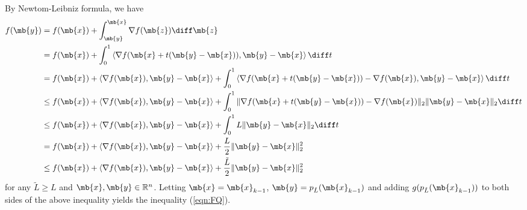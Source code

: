 \begin{exercise}
\begin{enumerate}
            \begin{solution}
                By Newtom-Leibniz formula, we have
                \begin{align*}
                    f(\mb{y}) & = f(\mb{x}) + \int_{\mb{y}}^{\mb{x}} \nabla f(\mb{z}) \diff \mb{z}                                                                                                                                 \\
                              & = f(\mb{x}) + \int_0^1 \left\langle \nabla f(\mb{x} + t(\mb{y} - \mb{x})), \mb{y} - \mb{x} \right\rangle \diff t                                                                                   \\
                              & = f(\mb{x}) + \left\langle \nabla f(\mb{x}), \mb{y} - \mb{x} \right\rangle + \int_0^1 \left\langle \nabla f(\mb{x} + t(\mb{y} - \mb{x})) - \nabla f(\mb{x}), \mb{y} - \mb{x} \right\rangle \diff t \\
                              & \le f(\mb{x}) + \left\langle \nabla f(\mb{x}), \mb{y} - \mb{x} \right\rangle  + \int_0^1 \| \nabla f(\mb{x} + t(\mb{y} - \mb{x})) - \nabla f(\mb{x}) \|_2 \|\mb{y} - \mb{x}\|_2 \diff t            \\
                              & \le f(\mb{x}) + \left\langle \nabla f(\mb{x}), \mb{y} - \mb{x} \right\rangle  + \int_0^1 L \| \mb{y} - \mb{x}\|_2 \diff t                                                                          \\
                              & = f(\mb{x}) + \left\langle \nabla f(\mb{x}), \mb{y} - \mb{x} \right\rangle  + \frac{L}{2} \| \mb{y} - \mb{x}\|_2^2                                                                                 \\
                              & \le f(\mb{x}) + \left\langle \nabla f(\mb{x}), \mb{y} - \mb{x} \right\rangle  + \frac{\tilde{L}}{2} \| \mb{y} - \mb{x}\|_2^2
                \end{align*}
                for any $\tilde{L}\ge L$ and $\mb{x}, \mb{y}\in \mathbb{R}^n$. Letting $\mb{x} = \mb{x}_{k-1}$, $\mb{y} = p_{\tilde{L}}(\mb{x}_{k-1})$ and adding $g(p_{\tilde{L}}(\mb{x}_{k-1}))$ to both sides of the above inequality yields the inequality (\ref{eqn:FQ}).


\end{solution}
\end{enumerate}
\end{exercise}
